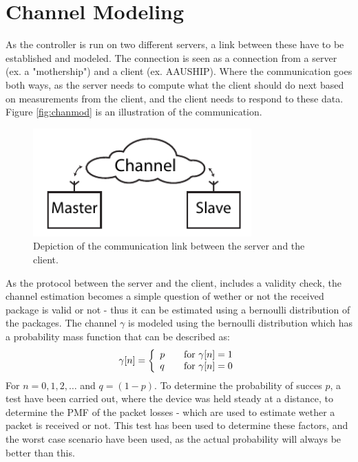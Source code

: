 \chapter{Channel Modeling}
As the controller is run on two different servers, a link between these have to be established and modeled. The connection is seen as a connection from a server (ex. a "mothership") and a client (ex. AAUSHIP). Where the communication goes both ways, as the server needs to compute what the client should do next based on measurements from the client, and the client needs to respond to these data. Figure \vref{fig:chanmod} is an illustration of the communication. 

\begin{figure}[htbp]
		\begin{center}
			\includegraphics[width=8.4cm]{img/chanmod}
			\caption{Depiction of the communication link between the server and the client.}
			\label{fig:chanmod}
		\end{center}
\end{figure}

As the protocol between the server and the client, includes a validity check, the channel estimation becomes a simple question of wether or not the received package is valid or not - thus it can be estimated using a bernoulli distribution of the packages. The channel $\gamma$ is modeled using the bernoulli distribution which has a probability mass function that can be described as:
\begin{align}
\gamma[n] = 
\left\{ 
  \begin{array}{l l}
    p & \quad \text{for}\,\, \gamma[n] = 1\\
    q & \quad \text{for}\,\, \gamma[n] = 0
  \end{array} \right.
\end{align}
For $n = 0,1,2,\dots$ and $q = (1-p)$. To determine the probability of succes $p$, a test have been carried out, where the device was held steady at a distance, to determine the PMF of the packet losses - which are used to estimate wether a packet is received or not. This test has been used to determine these factors, and the worst case scenario have been used, as the actual probability will always be better than this. 



